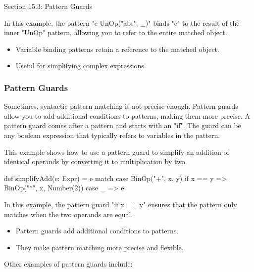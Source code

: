 \begin{notes}{Section 15.3: Pattern Guards}
\begin{highlight}
        In this example, the pattern "e \@ UnOp("abs", \_)" binds "e" to the result of the inner "UnOp" pattern, allowing you to refer to the entire matched object.
    
        \begin{itemize}
            \item Variable binding patterns retain a reference to the matched object.
            \item Useful for simplifying complex expressions.
        \end{itemize}
    
    \end{highlight}
    
    \subsubsection*{Pattern Guards}
    
    Sometimes, syntactic pattern matching is not precise enough. Pattern guards allow you to add additional conditions to patterns, making them more precise. A pattern guard comes after a pattern and 
    starts with an "if". The guard can be any boolean expression that typically refers to variables in the pattern.
    
    \begin{highlight}
    
        This example shows how to use a pattern guard to simplify an addition of identical operands by converting it to multiplication by two.
    
    \begin{code}[Scala]
    def simplifyAdd(e: Expr) = e match {
        case BinOp("+", x, y) if x == y => BinOp("*", x, Number(2))
        case _ => e
    }
    \end{code}
    
        In this example, the pattern guard "if x == y" ensures that the pattern only matches when the two operands are equal.
    
        \begin{itemize}
            \item Pattern guards add additional conditions to patterns.
            \item They make pattern matching more precise and flexible.
        \end{itemize}
    
    \end{highlight}
    
    Other examples of pattern guards include:
    

\end{notes}
